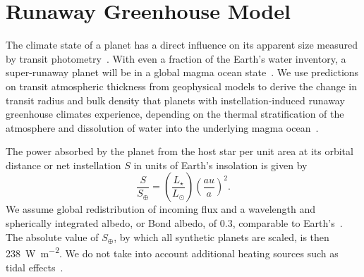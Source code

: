 \documentclass[twocolumn,twocolappendix]{aastex631}
\begin{document}
\section{Runaway Greenhouse Model}\label{sec:met_rghmodel}
The climate state of a planet has a direct influence on its apparent size measured by transit photometry~\citep{Turbet2019,Turbet2020,Mousis2020,2021ApJ...914...84A}.
With even a fraction of the Earth's water inventory, a super-runaway planet will be in a global magma ocean state~\citep{2021JGRE..12606711L,Boukrouche2021}.
We use predictions on transit atmospheric thickness from geophysical models to derive the change in transit radius and bulk density that planets with instellation-induced runaway greenhouse climates experience, depending on the thermal stratification of the atmosphere and dissolution of water into the underlying magma ocean~\citep{Dorn2021,2023Icar..39015265S}.

\begin{note}
    The power absorbed by the planet from the host star per unit area at its orbital distance or net instellation $S$ in units of Earth's insolation is given by
    \begin{equation}
        \frac{S}{S_\oplus} = \left(\frac{L_\star}{L_\odot}\right) \left(\frac{au}{a}\right)^2 .
    \end{equation}
    We assume global redistribution of incoming flux and a wavelength and spherically integrated albedo, or Bond albedo, of $0.3$, comparable to Earth's~\citep{Haar1971}.
    The absolute value of $S_\oplus$, by which all synthetic planets are scaled, is then \SI{238}{\watt\per\square\meter}.
   We do not take into account additional heating sources such as tidal effects~\citep[e.g.][]{Barnes2013}.
\end{note}
\end{document}

